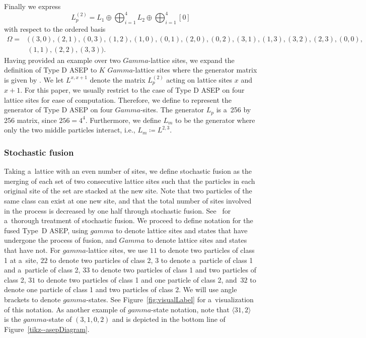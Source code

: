 \documentclass[10pt,a4paper]{amsart}
\numberwithin{equation}{section}
\theoremstyle{definition}
\def\Gamma{Gamma}
\def\gamma{gamma}
\begin{document}
Finally we express
\[L_p^{(2)} = L_1 \oplus \bigoplus_{i=1}^4 L_2 \oplus \bigoplus_{i=1}^4 [0]\]
with respect to the ordered basis
\begin{align*}
 \Omega ={}& ((3,0),(2,1),(0,3),(1,2),(1,0),(0,1),(2,0),(0,2),(3,1),(1,3),(3,2),(2,3),(0,0),\\ &(1,1),(2,2),(3,3) ).
\end{align*}
Having provided an example over two $\Gamma$-lattice sites, we expand the definition of Type D ASEP to $K$ $\Gamma$-lattice sites where the generator matrix is given by .
We let $L^{x,x+1}$ denote the matrix $L_p^{(2)}$ acting on lattice sites $x$ and $x+1$. For this paper, we usually restrict to the case of Type D ASEP on four lattice sites for ease of computation. Therefore, we define 
to represent the generator of Type D ASEP on four $\Gamma$-sites. The generator $L_p$ is a~256 by 256 matrix, since $256 = 4^4$. Furthermore, we define $L_m$ to be the generator where only the two middle particles interact, i.e., $L_m \coloneqq L^{2,3}$.

\subsubsection{Stochastic fusion} \label{stoch-fusion}
Taking a~lattice with an even number of sites, we define stochastic fusion as the merging of each set of two consecutive lattice sites such that the particles in each original site of the set are stacked at the new site. Note that two particles of the same class can exist at one new site, and that the total number of sites involved in the process is decreased by one half through stochastic fusion. See~\cite{kuan2019stochastic} for a~thorough treatment of stochastic fusion.
We proceed to define notation for the fused Type~D ASEP, using $\gamma$ to denote lattice sites and states that have undergone the process of fusion, and $\Gamma$ to denote lattice sites and states that have not. For $\gamma$-lattice sites, we use $11$ to denote two particles of class 1 at a~site, $22$ to denote two particles of class 2, $3$ to denote a~particle of class 1 and a~particle of class 2, $33$ to denote two particles of class 1 and two particles of class 2, $31$ to denote two particles of class 1 and one particle of class 2, and~$32$ to denote one particle of class 1 and two particles of class 2. We will use angle brackets to denote $\gamma$-states. See Figure~\ref{fig:visualLabel} for a~visualization of this notation. As another example of $\gamma$-state notation, note that $\langle 31,2 \rangle$ is the $\gamma$-state of $(3,1,0,2)$ and is depicted in the bottom line of Figure~\ref{tikz--asepDiagram}.
\end{document}
